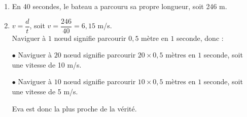 
\medskip

\begin{enumerate}
\item En 40 secondes, le bateau a parcouru sa propre longueur, soit 246 m. 
\item $v=\dfrac{d}{t}$, soit $v=\dfrac{246}{40}=6,15$ m/s. \\[2mm]
Naviguer à  $1$ nœud signifie parcourir $0,5$ mètre en $1$ seconde, donc :

\quad $\bullet$ Naviguer à  $20$ nœud signifie parcourir $20\times0,5$ mètres en $1$ seconde, soit une vitesse de 10 m/s.

\quad $\bullet$ Naviguer à  $10$ nœud signifie parcourir $10\times0,5$ mètres en $1$ seconde, soit une vitesse de 5 m/s.

 Eva est donc la plus proche de la vérité. 
\end{enumerate}


\vspace{0,5cm}

